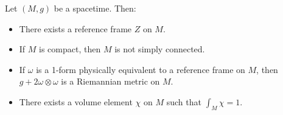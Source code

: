 Let $(M, g)$ be a spacetime. Then:
\begin{itemize}
\item[(a)] There exists a reference frame $Z$ on $M$.
\item[(b)] If $M$ is compact, then $M$ is not simply connected.
\item[(c)] If $\omega$ is a 1-form physically equivalent to a reference frame on $M$, then $g + 2\omega \otimes \omega$ is a Riemannian metric on $M$.
\item[(d)] There exists a volume element $\chi$ on $M$ such that $\int_M \chi = 1$.
\end{itemize}
